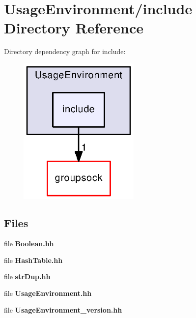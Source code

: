 \section{Usage\+Environment/include Directory Reference}
\label{dir_7a79109423cda6a6209d353ba1109726}
Directory dependency graph for include\+:
\nopagebreak
\begin{figure}[H]
\begin{center}
\leavevmode
\includegraphics[width=168pt]{dir_7a79109423cda6a6209d353ba1109726_dep}
\end{center}
\end{figure}
\subsection*{Files}
\begin{DoxyCompactItemize}
\item 
file {\bf Boolean.\+hh}
\item 
file {\bf Hash\+Table.\+hh}
\item 
file {\bf str\+Dup.\+hh}
\item 
file {\bf Usage\+Environment.\+hh}
\item 
file {\bf Usage\+Environment\+\_\+version.\+hh}
\end{DoxyCompactItemize}
